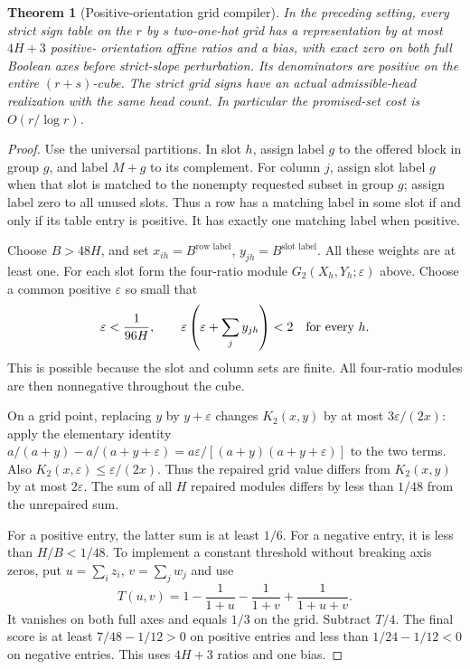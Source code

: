 \documentclass[11pt]{article}
\newtheorem{theorem}{Theorem}
\begin{document}
\begin{theorem}[Positive-orientation grid compiler]
In the preceding setting, every strict sign table on the $r$ by $s$
two-one-hot grid has a representation by at most $4H+3$ positive-
orientation affine ratios and a bias, with exact zero on both full
Boolean axes before strict-slope perturbation. Its denominators are
positive on the entire $(r+s)$-cube. The strict grid signs have an
actual admissible-head realization with the same head count.
In particular the promised-set cost is $O(r/\log r)$.
\end{theorem}
\begin{proof}
Use the universal partitions. In slot $h$, assign label $g$ to the
offered block in group $g$, and label $M+g$ to its complement.
For column $j$, assign slot label $g$ when that slot is matched to
the nonempty requested subset in group $g$; assign label zero to
all unused slots. Thus a row has a matching label in some slot
if and only if its table entry is positive. It has exactly one
matching label when positive.

Choose $B>48H$, and set $x_{ih}=B^{\text{row label}}$,
$y_{jh}=B^{\text{slot label}}$. All these weights are at least one.
For each slot form the four-ratio module
$G_2(X_h,Y_h;\varepsilon)$ above.
Choose a common positive $\varepsilon$ so small that
\[
 \varepsilon<\frac1{96H},
 \qquad
 \varepsilon\left(\varepsilon+\sum_j y_{jh}\right)<2
 \quad\hbox{for every }h.
\]
This is possible because the slot and column sets are finite.
All four-ratio modules are then nonnegative throughout the cube.

On a grid point, replacing $y$ by $y+\varepsilon$ changes
$K_2(x,y)$ by at most $3\varepsilon/(2x)$: apply the elementary
identity $a/(a+y)-a/(a+y+\varepsilon)
=a\varepsilon/[(a+y)(a+y+\varepsilon)]$ to the two terms.
Also $K_2(x,\varepsilon)\leq\varepsilon/(2x)$.
Thus the repaired grid value differs from $K_2(x,y)$ by at most
$2\varepsilon$. The sum of all $H$ repaired modules differs by
less than $1/48$ from the unrepaired sum.

For a positive entry, the latter sum is at least $1/6$.
For a negative entry, it is less than $H/B<1/48$.
To implement a constant threshold without breaking axis zeros, put
$u=\sum_i z_i$, $v=\sum_jw_j$ and use
\[
 T(u,v)=1-\frac1{1+u}-\frac1{1+v}+\frac1{1+u+v}.
\]
It vanishes on both full axes and equals $1/3$ on the grid.
Subtract $T/4$. The final score is at least $7/48-1/12>0$ on
positive entries and less than $1/24-1/12<0$ on negative entries.
This uses $4H+3$ ratios and one bias.


\end{proof}
\end{document}
